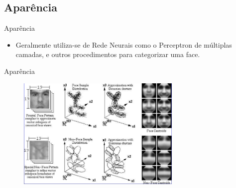 \documentclass[aspectratio=169, xcolor=dvipsnames]{beamer}
\let\olditem=\item%
\renewcommand{\item}{\olditem \justifying}
\begin{document}
\subsection{Aparência}
\begin{frame}{Aparência}
	\begin{itemize}
		\item Geralmente utiliza-se de Rede Neurais como o Perceptron de múltiplas camadas, e outros procedimentos para categorizar uma face.
	\end{itemize}
\end{frame}

\begin{frame}{Aparência}
\begin{figure}
	\centering
	\label{fig:inst}
	\includegraphics[width=0.7\textwidth]{img/m3-1.png}
\end{figure}
\end{frame}

\frame{\titlepage}




\frame{\titlepage}
\end{document}
